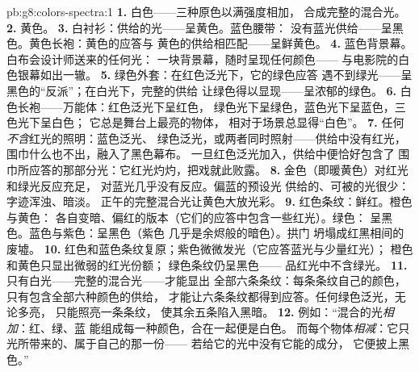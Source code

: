 \begin{solution}{pb:g8:colors-spectra:1}
\textbf{1.} 白色——三种原色以满强度相加，
合成完整的混合光。
\textbf{2.} 黄色。
\textbf{3.} 白衬衫：供给的光——呈黄色。蓝色腰带：
没有蓝光供给——呈黑色。黄色长袍：黄色的应答与
黄色的供给相匹配——呈鲜黄色。
\textbf{4.} 蓝色背景幕。白布会设计师送来的任何光：
一块背景幕，随时呈现任何颜色——
与电影院的白色银幕如出一辙。
\textbf{5.} 绿色外套：在红色泛光下，它的绿色应答
遇不到绿光——呈黑色的“反派”；在白光下，完整的供给
让绿色得以显现——呈浓郁的绿色。
\textbf{6.} 白色长袍——万能体：红色泛光下呈红色，
绿色光下呈绿色，蓝色光下呈蓝色，三色光下呈白色；
它总是舞台上最亮的物体，
相对于场景总显得“白色”。
\textbf{7.} 任何\emph{不含}红光的照明：蓝色泛光、
绿色泛光，或两者同时照射——供给中没有红光，
围巾什么也不出，融入了黑色幕布。
一旦红色泛光加入，供给中便恰好包含了
围巾所应答的那部分光：它红光灼灼，把戏就此败露。
\textbf{8.} 金色（即暖黄色）对红光和绿光反应充足，
对蓝光几乎没有反应。偏蓝的预设光
供给的、可被的光很少：字迹浑浊、暗淡。
正午的完整混合光让黄色大放光彩。
\textbf{9.} 红色条纹：鲜红。橙色与黄色：
各自变暗、偏红的版本（它们的应答中包含一些红光）。绿色：
呈黑色。蓝色与紫色：呈黑色（紫色
几乎是余烬般的暗色）。拱门
坍塌成红黑相间的废墟。
\textbf{10.} 红色和蓝色条纹复原；紫色微微发光（它应答蓝光与少量红光）；
橙色和黄色只显出微弱的红光份额；
绿色条纹仍呈黑色——
品红光中不含绿光。
\textbf{11.} 只有白光——完整的混合光——才能显出
全部六条条纹：每条条纹自己的颜色，只有包含全部六种颜色的供给，
才能让六条条纹都得到应答。任何绿色泛光，无论多亮，
只能照亮一条条纹，
使其余五条陷入黑暗。
\textbf{12.} 例如：“混合的光\emph{相加}：红、绿、蓝
能组成每一种颜色，合在一起便是白色。
而每个物体\emph{相减}：它只光所带来的、属于自己的那一份——
若给它的光中没有它能的成分，
它便披上黑色。”
\end{solution}

